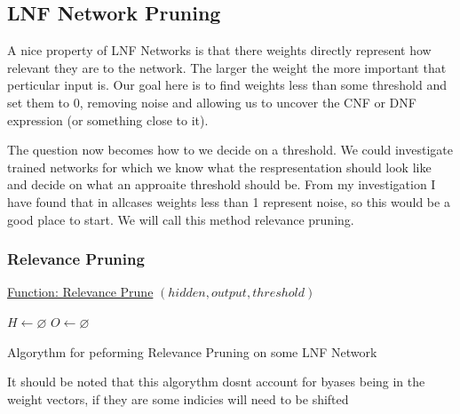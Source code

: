 \documentclass{article}
\theoremstyle{definition}
\begin{document}
\subsection{LNF Network Pruning}
A nice property of LNF Networks is that there weights directly represent how relevant they are to the network. The larger the weight the more important that perticular input is. Our goal here is to find weights less than some threshold and set them to 0, removing noise and allowing us to uncover the CNF or DNF expression (or something close to it).

The question now becomes how to we decide on a threshold. We could investigate trained networks for which we know what the respresentation should look like and decide on what an approaite threshold should be. From my investigation I have found that in allcases weights less than 1 represent noise, so this would be a good place to start. We will call this method relevance pruning.

\subsubsection{Relevance Pruning}
\begin{algorithm}

\underline{Function: Relevance Prune} $(hidden,output,threshold)$\\

$H \gets \varnothing$
$O \gets \varnothing$

\caption{Algorythm for peforming Relevance Pruning on some LNF Network}
\end{algorithm}

It should be noted that this algorythm dosnt account for byases being in the weight vectors, if they are some indicies will need to be shifted

\medskip


\end{document}
